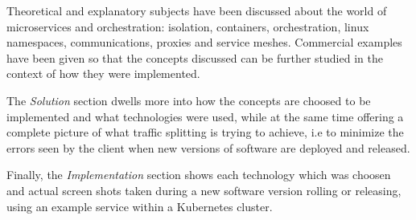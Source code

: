 \documentclass[conference]{IEEEtran}
\begin{document}
    Theoretical and explanatory subjects have been discussed about the world of microservices and orchestration: isolation, containers, orchestration, linux namespaces, communications, proxies and service meshes. Commercial examples have been given so that the concepts discussed can be further studied in the context of how they were implemented.

    The \textit{Solution} section dwells more into how the concepts are choosed to be implemented and what technologies were used, while at the same time offering a complete picture of what traffic splitting is trying to achieve, i.e to minimize the errors seen by the client when new versions of software are deployed and released.

    Finally, the \textit{Implementation} section shows each technology which was choosen and actual screen shots taken during a new software version rolling or releasing, using an example service within a Kubernetes cluster.

\balance
\end{document}
